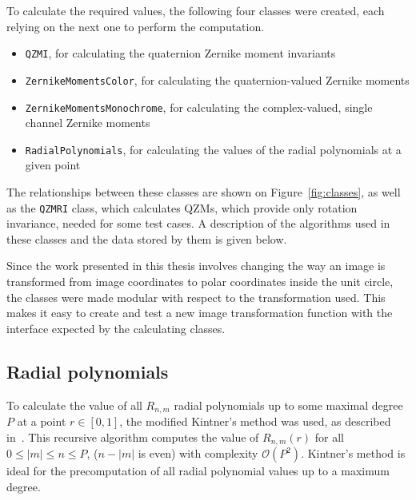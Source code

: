 To calculate the required values, the following four classes were created, each relying on the next one to perform the computation.
\begin{itemize}
    \item \texttt{QZMI}, for calculating the quaternion Zernike moment invariants
    \item \texttt{ZernikeMomentsColor}, for calculating the quaternion-valued Zernike moments
    \item \texttt{ZernikeMomentsMonochrome}, for calculating the complex-valued, single channel Zernike moments
    \item \texttt{RadialPolynomials}, for calculating the values of the radial polynomials at a given point
\end{itemize}
The relationships between these classes are shown on Figure~\ref{fig:classes}, as well as the \texttt{QZMRI} class, which calculates QZMs, which provide only rotation invariance, needed for some test cases. A description of the algorithms used in these classes and the data stored by them is given below.

Since the work presented in this thesis involves changing the way an image is transformed from image coordinates to polar coordinates inside the unit circle, the classes were made modular with respect to the transformation used. This makes it easy to create and test a new image transformation function with the interface expected by the calculating classes.

\subsection{Radial polynomials}
To calculate the value of all $R_{n,m}$ radial polynomials up to some maximal degree $P$ at a point $r \in [0,1]$, the modified Kintner's method was used, as described in~\cite{kintner}. This recursive algorithm computes the value of $R_{n,m}(r)$ for all $0 \leq |m| \leq n \leq P$, ($n - |m|$ is even) with complexity $\mathcal{O}(P^2)$. Kintner's method is ideal for the precomputation of all radial polynomial values up to a maximum degree.


